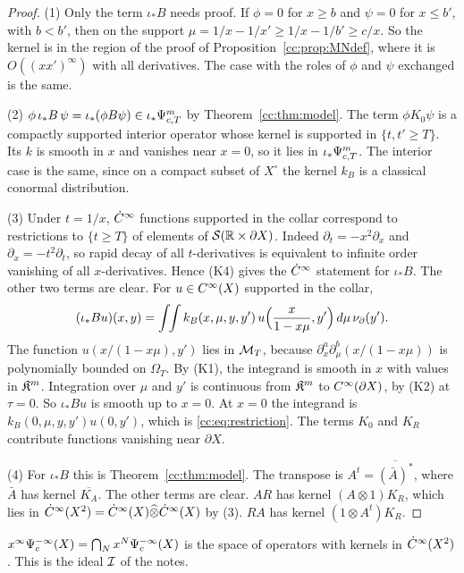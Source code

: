 \begin{proof}
(1) Only the term \(\iota_*B\) needs proof. If \(\phi=0\) for \(x\ge b\)
and \(\psi=0\) for \(x\le b'\), with \(b<b'\), then on the support
\(\mu=1/x-1/x'\ge1/x-1/b'\ge c/x\). So the kernel is in the region of
the proof of Proposition~\ref{cc:prop:MNdef}, where it is
\(O((xx')^\infty)\) with all derivatives. The case with the roles of
\(\phi\) and \(\psi\) exchanged is the same.

(2) \(\phi\,\iota_*B\,\psi=\iota_*(\phi B\psi)\in\iota_*\Psi_{c,T}^m\) by
Theorem~\ref{cc:thm:model}. The term \(\phi K_0\psi\) is a compactly
supported interior operator whose kernel is supported in
\(\{t,t'\ge T\}\). Its \(k\) is smooth in \(x\) and vanishes near
\(x=0\), so it lies in \(\iota_*\Psi_{c,T}^m\). The interior case is the same,
since on a compact subset of \(X^\circ\) the kernel \(k_B\) is a classical
conormal distribution.

(3) Under \(t=1/x\), \(\dot C^\infty\) functions supported in the collar correspond
to restrictions to \(\{t\ge T\}\) of elements of \(\mathcal S(\mathbb R\times
\partial X)\). Indeed \(\partial_t=-x^2\partial_x\) and
\(\partial_x=-t^2\partial_t\), so rapid decay of all \(t\)-derivatives is
equivalent to infinite order vanishing of all \(x\)-derivatives. Hence (K4)
gives the \(\dot C^\infty\) statement for \(\iota_*B\). The other two terms are
clear. For \(u\in C^\infty(X)\) supported in the collar,
\[
 (\iota_*Bu)(x,y)=\int\!\!\int k_B(x,\mu,y,y')\,
 u\Bigl(\frac x{1-x\mu},y'\Bigr)\,d\mu\,\nu_\partial(y').
\]
The function \(u(x/(1-x\mu),y')\) lies in \(\mathcal M_T\), because
\(\partial_x^a\partial_\mu^b(x/(1-x\mu))\) is polynomially bounded on
\(\Omega_T\). By (K1), the integrand is smooth in \(x\) with values in
\(\mathfrak K^m\). Integration over \(\mu\) and \(y'\) is continuous from
\(\mathfrak K^m\) to \(C^\infty(\partial X)\), by (K2) at \(\tau=0\). So \(\iota_*Bu\) is
smooth up to \(x=0\). At \(x=0\) the integrand is
\(k_B(0,\mu,y,y')u(0,y')\), which is \eqref{cc:eq:restriction}. The
terms \(K_0\) and \(K_R\) contribute functions vanishing near
\(\partial X\).

(4) For \(\iota_*B\) this is Theorem~\ref{cc:thm:model}. The transpose
is \(A^t=\overline{(\bar A)^*}\), where \(\bar A\) has kernel
\(\overline{K_A}\). The other terms are clear. \(AR\) has kernel
\((A\otimes1)K_R\), which lies in \(\dot C^\infty(X^2)=\dot C^\infty(X)\widehat\otimes
\dot C^\infty(X)\) \cite{Treves} by (3). \(RA\) has kernel \((1\otimes A^t)K_R\).
\end{proof}

\begin{lemma}\label{cc:lem:residual}
\(x^\infty\Psi_{c}^{-\infty}(X)=\bigcap_Nx^N\Psi_{c}^{-\infty}(X)\) is the space
of operators with kernels in \(\dot C^\infty(X^2)\). This is the ideal \(\mathcal I\) of
the notes.
\end{lemma}

